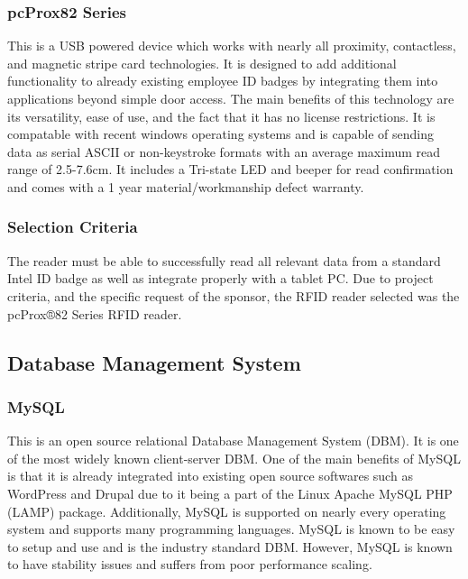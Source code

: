 \documentclass[10pt, onecolumn, twoside, peerreview]{IEEEtran}
\begin{document}
\subsubsection{pcProx82 Series}
This is a USB powered device which works with nearly all proximity, contactless, and magnetic stripe card technologies.
It is designed to add additional functionality to already existing employee ID badges by integrating them into
applications beyond simple door access. The main benefits of this technology are its versatility, ease of use, and the
fact that it has no license restrictions. It is compatable with recent windows operating systems and is capable of
sending data as serial ASCII or non-keystroke formats with an average maximum read range of 2.5-7.6cm. It includes a
Tri-state LED and beeper for read confirmation and comes with a 1 year material/workmanship defect warranty.\\

\subsubsection{Selection Criteria}
The reader must be able to successfully read all relevant data from a standard Intel ID badge as well as integrate
properly with a tablet PC. Due to project criteria, and the specific request of the sponsor, the RFID reader selected
was the pcProx®82 Series RFID reader.

\subsection{Database Management System}
\subsubsection{MySQL}
This is an open source relational Database Management System (DBM). It is one of the most widely known client-server
DBM. One of the main benefits of MySQL is that it is already integrated into existing open source softwares such as
WordPress and Drupal due to it being a part of the Linux Apache MySQL PHP (LAMP) package. Additionally, MySQL is
supported on nearly every operating system and supports many programming languages. MySQL is known to be easy to setup
and use and is the industry standard DBM. However, MySQL is known to have stability issues and suffers from poor
performance scaling.\\
\end{document}

